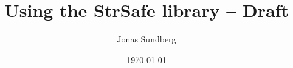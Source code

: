 \documentclass[a4paper,11pt,titlepage,draft]{article}
\title{Using the StrSafe library -- Draft}
\date{\today}
\author{Jonas Sundberg}
\begin{document}
\maketitle

\begin{abstract}

\end{abstract}

\tableofcontents
\clearpage




\end{document}
